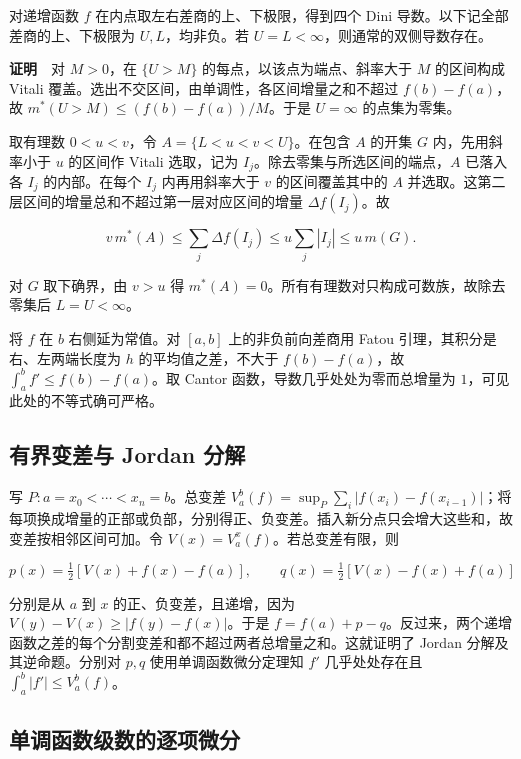 \documentclass[11pt,a4paper]{article}
\begin{document}
对递增函数 \(f\) 在内点取左右差商的上、下极限，得到四个 Dini 导数。以下记全部差商的上、下极限为 \(U,L\)，均非负。若 \(U=L<\infty\)，则通常的双侧导数存在。

\textbf{证明}　对 \(M>0\)，在 \(\{U>M\}\) 的每点，以该点为端点、斜率大于 \(M\) 的区间构成 Vitali 覆盖。选出不交区间，由单调性，各区间增量之和不超过 \(f(b)-f(a)\)，故 \(m^*(U>M)\le(f(b)-f(a))/M\)。于是 \(U=\infty\) 的点集为零集。

取有理数 \(0<u<v\)，令 \(A=\{L<u<v<U\}\)。在包含 \(A\) 的开集 \(G\) 内，先用斜率小于 \(u\) 的区间作 Vitali 选取，记为 \(I_j\)。除去零集与所选区间的端点，\(A\) 已落入各 \(I_j\) 的内部。在每个 \(I_j\) 内再用斜率大于 \(v\) 的区间覆盖其中的 \(A\) 并选取。这第二层区间的增量总和不超过第一层对应区间的增量 \(\Delta f(I_j)\)。故

\[
v\,m^*(A)\le\sum_j\Delta f(I_j)\le u\sum_j|I_j|\le u\,m(G).
\]

对 \(G\) 取下确界，由 \(v>u\) 得 \(m^*(A)=0\)。所有有理数对只构成可数族，故除去零集后 \(L=U<\infty\)。

将 \(f\) 在 \(b\) 右侧延为常值。对 \([a,b]\) 上的非负前向差商用 Fatou 引理，其积分是右、左两端长度为 \(h\) 的平均值之差，不大于 \(f(b)-f(a)\)，故 \(\int_a^b f'\le f(b)-f(a)\)。取 Cantor 函数，导数几乎处处为零而总增量为 \(1\)，可见此处的不等式确可严格。

\subsection*{有界变差与 Jordan 分解}\label{ux6709ux754cux53d8ux5deeux4e0e-jordan-ux5206ux89e3}

写 \(P:a=x_0<\cdots<x_n=b\)。总变差 \(V_a^b(f)=\sup_P\sum_i|f(x_i)-f(x_{i-1})|\)；将每项换成增量的正部或负部，分别得正、负变差。插入新分点只会增大这些和，故变差按相邻区间可加。令 \(V(x)=V_a^x(f)\)。若总变差有限，则

\[
p(x)=\tfrac12[V(x)+f(x)-f(a)],\qquad
q(x)=\tfrac12[V(x)-f(x)+f(a)]
\]

分别是从 \(a\) 到 \(x\) 的正、负变差，且递增，因为 \(V(y)-V(x)\ge|f(y)-f(x)|\)。于是 \(f=f(a)+p-q\)。反过来，两个递增函数之差的每个分割变差和都不超过两者总增量之和。这就证明了 Jordan 分解及其逆命题。分别对 \(p,q\) 使用单调函数微分定理知 \(f'\) 几乎处处存在且 \(\int_a^b|f'|\le V_a^b(f)\)。

\subsection*{单调函数级数的逐项微分}\label{ux5355ux8c03ux51fdux6570ux7ea7ux6570ux7684ux9010ux9879ux5faeux5206}
\end{document}
